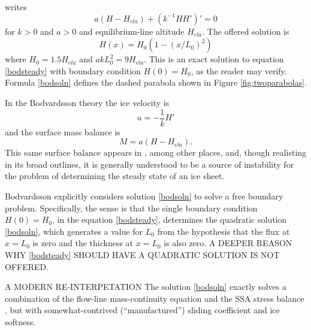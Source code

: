 \documentclass[twocolumn,letterpaper]{igs}
\begin{document}
\citet[equation (17)]{Bodvardsson} writes 
\begin{equation}
a (H - H_{ela}) + (k^{-1} H H')' = 0  \label{bodsteady}
\end{equation}
for $k>0$ and $a>0$ and equilibrium-line altitude $H_{ela}$.  The offered solution \citep[equation (23)]{Bodvardsson} is
\begin{equation}
H(x) = H_0 (1 - (x/L_0)^2)  \label{bodsoln}
\end{equation}
where $H_0 = 1.5 H_{ela}$ and $a k L_0^2 = 9 H_{ela}$.  This is an exact solution to equation \eqref{bodsteady} with boundary condition $H(0)=H_0$, as the reader may verify.  Formula \eqref{bodsoln} defines the dashed parabola shown in Figure \ref{fig:twoparabolas}.

In the Bodvardsson theory the ice velocity is
\begin{equation}
u = - \frac{1}{k} H' \label{bodstressbalance}
\end{equation}
and the surface mass balance is
\begin{equation}
M = a (H - H_{ela}).  \label{bodmassbalance}
\end{equation}
This same surface balance appears in \cite{Weertman61stability,Jouvetetal2011}, among other places, and, though realisting in its broad outlines, it is generally understood to be a source of instability for the problem of determining the steady state of an ice sheet.

Bodvardsson explicitly considers solution \eqref{bodsoln} to solve a free boundary problem.  Specifically, the sense is that the single boundary condition $H(0)=H_0$, in the equation \eqref{bodsteady}, determines the quadratic solution \eqref{bodsoln}, which generates a value for $L_0$ from the hypothesis that the flux at $x=L_0$ is zero and the thickness at $x=L_0$ is also zero.  A DEEPER REASON WHY \eqref{bodsteady} SHOULD HAVE A QUADRATIC SOLUTION IS NOT OFFERED.

A MODERN RE-INTERPETATION  The solution \eqref{bodsoln} exactly solves a combination of the flow-line mass-continuity equation and the SSA stress balance \citep{MacAyeal,WeisGreveHutter}, but with somewhat-contrived (``manufactured'') sliding coefficient and ice softness.
\end{document}
